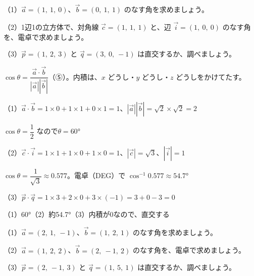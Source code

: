 \begin{reidai}[内積となす角・直交]
（1）$\vec a=(1,\ 1,\ 0)$、$\vec b=(0,\ 1,\ 1)$ のなす角を求めましょう。\par
（2）1辺1の立方体で、対角線 $\vec c=(1,\ 1,\ 1)$ と、辺 $\vec i=(1,\ 0,\ 0)$ のなす角を、電卓で求めましょう。\par
（3）$\vec p=(1,\ 2,\ 3)$ と $\vec q=(3,\ 0,\ -1)$ は直交するか、調べましょう。\par
\kangaekata $\cos\theta=\dfrac{\vec a\cdot\vec b}{|\vec a||\vec b|}$（⑤）。内積は、$x$ どうし・$y$ どうし・$z$ どうしをかけてたす。\par
\shiki（1）$\vec a\cdot\vec b=1\times0+1\times1+0\times1=1$、\enspace $|\vec a||\vec b|=\sqrt2\times\sqrt2=2$\par
\hspace*{4.6\zw}$\cos\theta=\dfrac{1}{2}$ なので\enspace $\theta=60°$\par
\hspace*{2.6\zw}（2）$\vec c\cdot\vec i=1\times1+1\times0+1\times0=1$、\enspace $|\vec c|=\sqrt3$、\enspace $|\vec i|=1$\par
\hspace*{4.6\zw}$\cos\theta=\dfrac{1}{\sqrt3}\approx0.577$。電卓（DEG）で $\cos^{-1}0.577\approx54.7°$\par
\hspace*{2.6\zw}（3）$\vec p\cdot\vec q=1\times3+2\times0+3\times(-1)=3+0-3=0$\par
\kotae （1）60°\quad（2）約54.7°\quad（3）内積が0なので、直交する
\end{reidai}

\begin{jibun}
（1）$\vec a=(2,\ 1,\ -1)$、$\vec b=(1,\ 2,\ 1)$ のなす角を求めましょう。\par
（2）$\vec a=(1,\ 2,\ 2)$、$\vec b=(2,\ -1,\ 2)$ のなす角を、電卓で求めましょう。\par
（3）$\vec p=(2,\ -1,\ 3)$ と $\vec q=(1,\ 5,\ 1)$ は直交するか、調べましょう。
\end{jibun}

